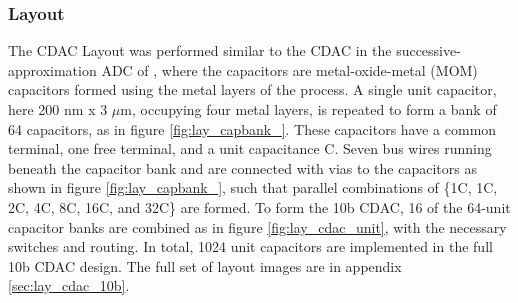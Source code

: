 		\subsubsection{Layout}
		The CDAC Layout was performed similar to the CDAC in the successive-approximation ADC of \cite{Wulff2017}, where the capacitors are metal-oxide-metal (MOM) capacitors formed using the metal layers of the process. A single unit capacitor, here 200 nm x 3 $\mu$m, occupying four metal layers, is repeated to form a bank of 64 capacitors, as in figure \ref{fig:lay_capbank_}. These capacitors have a common terminal, one free terminal, and a unit capacitance C. Seven bus wires running beneath the capacitor bank and are connected with vias to the capacitors as shown in figure \ref{fig:lay_capbank_}, such that parallel combinations of \{1C, 1C, 2C, 4C, 8C, 16C, and 32C\} are formed. To form the 10b CDAC, 16 of the 64-unit capacitor banks are combined as in figure \ref{fig:lay_cdac_unit}, with the necessary switches and routing. In total, 1024 unit capacitors are implemented in the full 10b CDAC design. The full set of layout images are in appendix \ref{sec:lay_cdac_10b}.
